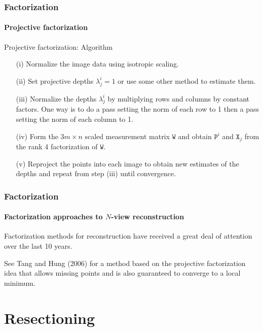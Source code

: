 \documentclass[aspectratio=169]{beamer}
\newcommand{\mat}[1]{\mathtt{#1}}
\begin{document}
\begin{frame}
\frametitle{Factorization}
\framesubtitle{Projective factorization}

\begin{block}{Projective factorization: Algorithm}
\begin{itemize}
\item[(i)] Normalize the image data using isotropic scaling.
\item[(ii)] Set projective depths $\lambda_j^i=1$ or use some other
  method to estimate them.
\item[(iii)] Normalize the depths $\lambda_j^i$ by multiplying rows
  and columns by constant factors.  One way is to do a pass setting the
  norm of each row to 1 then a pass setting the norm of each column to
  1.
\item[(iv)] Form the $3m\times n$ scaled measurement matrix $\mat{W}$
  and obtain $\mat{P}^i$ and $\mat{X}_j$ from the rank 4 factorization
  of $\mat{W}$.
\item[(v)] Reproject the points into each image to obtain new
  estimates of the depths and repeat from step (iii) until
  convergence.
\end{itemize}
\end{block}

\end{frame}


\begin{frame}
\frametitle{Factorization}
\framesubtitle{Factorization approaches to $N$-view reconstruction}

Factorization methods for reconstruction have received a great deal of
attention over the last 10 years.

\medskip

See Tang and Hung (2006) for a method based on the projective
factorization idea that \alert{allows missing points} and is also
\alert{guaranteed to converge} to a local minimum.

\end{frame}


\section{Resectioning}
\end{document}
